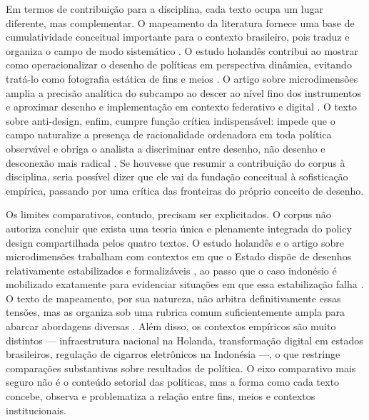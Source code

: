 \documentclass[12pt,a4paper]{article}
\begin{document}
Em termos de contribuição para a disciplina, cada texto ocupa um lugar diferente, mas complementar. O mapeamento da literatura fornece uma base de cumulatividade conceitual importante para o contexto brasileiro, pois traduz e organiza o campo de modo sistemático \parencite{lima2021_conectando_problemas}. O estudo holandês contribui ao mostrar como operacionalizar o desenho de políticas em perspectiva dinâmica, evitando tratá-lo como fotografia estática de fins e meios \parencite{geet2019_policy_design}. O artigo sobre microdimensões amplia a precisão analítica do subcampo ao descer ao nível fino dos instrumentos e aproximar desenho e implementação em contexto federativo e digital \parencite{lui2026_micro_dimensions}. O texto sobre anti-design, enfim, cumpre função crítica indispensável: impede que o campo naturalize a presença de racionalidade ordenadora em toda política observável e obriga o analista a discriminar entre desenho, não desenho e desconexão mais radical \parencite{newman2020_policy_design}. Se houvesse que resumir a contribuição do corpus à disciplina, seria possível dizer que ele vai da fundação conceitual à sofisticação empírica, passando por uma crítica das fronteiras do próprio conceito de desenho.

Os limites comparativos, contudo, precisam ser explicitados. O corpus não autoriza concluir que exista uma teoria única e plenamente integrada do policy design compartilhada pelos quatro textos. O estudo holandês e o artigo sobre microdimensões trabalham com contextos em que o Estado dispõe de desenhos relativamente estabilizados e formalizáveis \parencite{geet2019_policy_design,lui2026_micro_dimensions}, ao passo que o caso indonésio é mobilizado exatamente para evidenciar situações em que essa estabilização falha \parencite{newman2020_policy_design}. O texto de mapeamento, por sua natureza, não arbitra definitivamente essas tensões, mas as organiza sob uma rubrica comum suficientemente ampla para abarcar abordagens diversas \parencite{lima2021_conectando_problemas}. Além disso, os contextos empíricos são muito distintos — infraestrutura nacional na Holanda, transformação digital em estados brasileiros, regulação de cigarros eletrônicos na Indonésia —, o que restringe comparações substantivas sobre resultados de política. O eixo comparativo mais seguro não é o conteúdo setorial das políticas, mas a forma como cada texto concebe, observa e problematiza a relação entre fins, meios e contextos institucionais.
\end{document}
